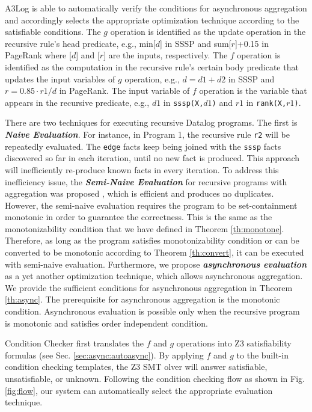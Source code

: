 A3Log is able to automatically verify the conditions for asynchronous aggregation and accordingly selects the appropriate optimization technique according to the satisfiable conditions. The $g$ operation is identified as the update operation in the recursive rule's head predicate, e.g., min[$d$] in SSSP and sum[$r$]+0.15 in PageRank where [$d$] and [$r$] are the inputs, respectively. The $f$ operation is identified as the computation in the recursive rule's certain body predicate that updates the input variables of $g$ operation, e.g., $d=d1+d2$ in SSSP and $r=0.85\cdot r1/d$ in PageRank. The input variable of $f$ operation is the variable that appears in the recursive predicate, e.g., $d1$ in \texttt{sssp(X,$d1$)} and $r1$ in \texttt{rank(X,$r1$)}.

There are two techniques for executing recursive Datalog programs. The first is \emph{\textbf{Naive Evaluation}}. For instance, in Program 1, the recursive rule \texttt{r2} will be repeatedly evaluated. The \texttt{edge} facts keep being joined with the \texttt{sssp} facts discovered so far in each iteration, until no new fact is produced. This approach will inefficiently re-produce known facts in every iteration. To address this inefficiency issue, the \emph{\textbf{Semi-Naive Evaluation}} for recursive programs with aggregation was proposed \cite{Lam:2013:SDE:2510649.2511289,Wang:2015:AFR:2824032.2824052}, which is efficient and produces no duplicates. However, the semi-naive evaluation requires the program to be set-containment monotonic in order to guarantee the correctness. This is the same as the monotonizability condition that we have defined in Theorem \ref{th:monotone}. Therefore, as long as the program satisfies monotonizability condition or can be converted to be monotonic according to Theorem \ref{th:convert}, it can be executed with semi-naive evaluation. Furthermore, we propose \emph{\textbf{asynchronous evaluation}} as a yet another optimization technique, which allows asynchronous aggregation. We provide the sufficient conditions for asynchronous aggregation in Theorem \ref{th:async}. The prerequisite for asynchronous aggregation is the monotonic condition. Asynchronous evaluation is possible only when the recursive program is monotonic and satisfies order independent condition.

Condition Checker first translates the $f$ and $g$ operations into Z3 \cite{DeMoura:2008:ZES:1792734.1792766} satisfiability formulas (see Sec. \ref{sec:async:autoasync}). By applying $f$ and $g$ to the built-in condition checking templates, the Z3 SMT olver will answer satisfiable, unsatisfiable, or unknown. Following the condition checking flow as shown in Fig. \ref{fig:flow}, our system can automatically select the appropriate evaluation technique.

